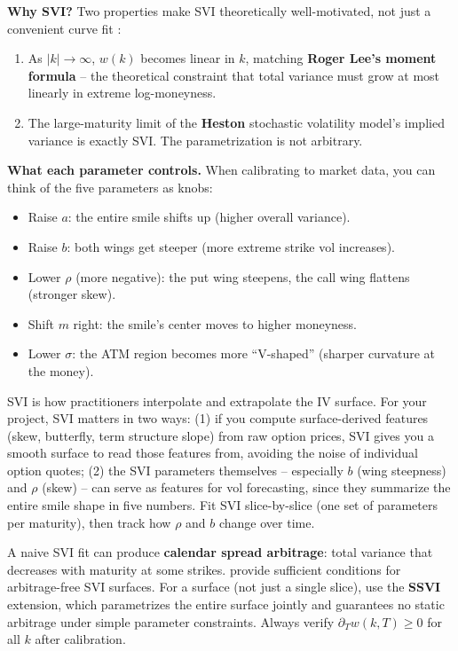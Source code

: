 \textbf{Why SVI?}
Two properties make SVI theoretically well-motivated, not just a convenient curve fit \citep{GatheralJacquier2014}:
\begin{enumerate}[nosep]
  \item As $|k| \to \infty$, $w(k)$ becomes linear in $k$, matching \textbf{Roger Lee's moment formula} -- the theoretical constraint that total variance must grow at most linearly in extreme log-moneyness.
  \item The large-maturity limit of the \textbf{Heston} stochastic volatility model's implied variance is exactly SVI. The parametrization is not arbitrary.
\end{enumerate}

\textbf{What each parameter controls.}
When calibrating to market data, you can think of the five parameters as knobs:
\begin{itemize}[nosep]
  \item Raise $a$: the entire smile shifts up (higher overall variance).
  \item Raise $b$: both wings get steeper (more extreme strike vol increases).
  \item Lower $\rho$ (more negative): the put wing steepens, the call wing flattens (stronger skew).
  \item Shift $m$ right: the smile's center moves to higher moneyness.
  \item Lower $\sigma$: the ATM region becomes more ``V-shaped'' (sharper curvature at the money).
\end{itemize}

\begin{projectconnection}
SVI is how practitioners interpolate and extrapolate the IV surface.
For your project, SVI matters in two ways:
(1) if you compute surface-derived features (skew, butterfly, term structure slope) from raw option prices, SVI gives you a smooth surface to read those features from, avoiding the noise of individual option quotes;
(2) the SVI parameters themselves -- especially $b$ (wing steepness) and $\rho$ (skew) -- can serve as features for vol forecasting, since they summarize the entire smile shape in five numbers.
Fit SVI slice-by-slice (one set of parameters per maturity), then track how $\rho$ and $b$ change over time.
\end{projectconnection}

\begin{warning}
A naive SVI fit can produce \textbf{calendar spread arbitrage}: total variance that decreases with maturity at some strikes.
\citet{GatheralJacquier2014} provide sufficient conditions for arbitrage-free SVI surfaces.
For a surface (not just a single slice), use the \textbf{SSVI} extension, which parametrizes the entire surface jointly and guarantees no static arbitrage under simple parameter constraints.
Always verify $\partial_T w(k,T) \geq 0$ for all $k$ after calibration.
\end{warning}


